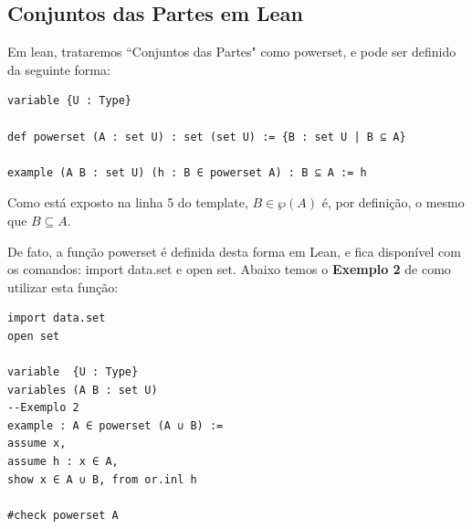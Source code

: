 \subsection{Conjuntos das Partes em Lean}
Em lean, trataremos ``Conjuntos das Partes"  como {\selectfont powerset}, e pode ser definido da seguinte forma:
\begin{lstlisting}
variable {U : Type}

def powerset (A : set U) : set (set U) := {B : set U | B ⊆ A}

example (A B : set U) (h : B ∈ powerset A) : B ⊆ A := h \end{lstlisting}

Como está exposto na linha 5 do template, $B \in \wp(A)$ é, por definição, o mesmo que $B \subseteq A$.

De fato, a função {\selectfont powerset} é definida desta forma em Lean, e fica disponível com os comandos: {\selectfont import data.set} e {\selectfont open set}. Abaixo temos o \textbf{Exemplo 2} de como utilizar esta função:
\begin{lstlisting}
import data.set
open set

variable  {U : Type}
variables (A B : set U)
--Exemplo 2
example : A ∈ powerset (A ∪ B) :=
assume x,
assume h : x ∈ A,
show x ∈ A ∪ B, from or.inl h

#check powerset A \end{lstlisting}


